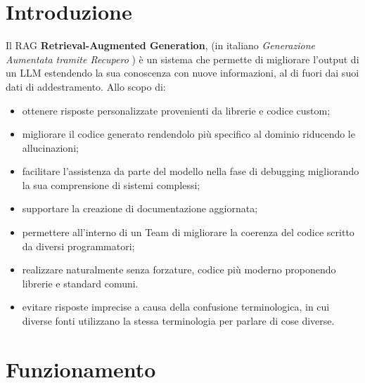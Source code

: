 \documentclass[12pt,a4paper,openright,twoside]{book}
\begin{document}
\section{Introduzione}
Il RAG \textbf{Retrieval-Augmented Generation}, (in italiano \textit{Generazione Aumentata tramite Recupero} )  è un sistema che permette di migliorare l'output di un LLM estendendo la sua conoscenza con nuove informazioni, al di fuori dai suoi dati di addestramento.
Allo scopo di:
\begin{itemize}
    \item ottenere risposte personalizzate provenienti da librerie e codice custom;
    \item migliorare il codice generato rendendolo più specifico al dominio riducendo le allucinazioni;
    \item facilitare l'assistenza da parte del modello nella fase di debugging migliorando la sua comprensione di sistemi complessi;
    \item supportare la creazione di documentazione aggiornata;
    \item permettere all'interno di un Team di migliorare la coerenza del codice scritto da diversi programmatori;
    \item realizzare naturalmente senza forzature, codice più moderno proponendo librerie e standard comuni.
    \item evitare risposte imprecise a causa della confusione terminologica, in cui diverse fonti utilizzano la stessa terminologia per parlare di cose diverse.
\end{itemize}

\section{Funzionamento}
\end{document}
